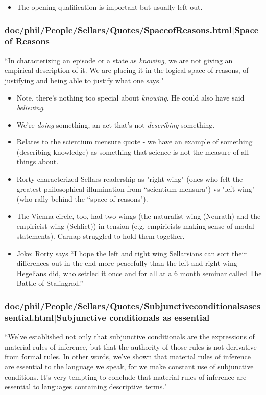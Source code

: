 \documentclass[12pt,a4paper]{report}
\begin{document}
\cite{sellars1956empiricism}

\begin{itemize}
    \item The opening qualification is important but usually left out.
\end{itemize}

\subsubsection{doc/phil/People/Sellars/Quotes/SpaceofReasons.html|Space of Reasons}
``In characterizing an episode or a state as \emph{knowing}, we are not giving an empirical description of it. We are placing it in the logical space of reasons, of justifying and being able to justify what one says." \cite{sellars1956empiricism}
    \begin{itemize}
        \item Note, there's nothing too special about \emph{knowing}. He could also have said \emph{believing}.
        \item  We're \emph{doing} something, an act that's not \emph{describing} something.
        \item Relates to the scientium mensure quote - we have an example of something (describing knowledge) as something that science is not the measure of all things about.
        \item Rorty characterized Sellars readership as "right wing" (ones who felt the greatest philosophical illumination from ``scientium mensura") vs "left wing" (who rally behind the ``space of reasons").
        \item The Vienna circle, too, had two wings (the naturalist wing (Neurath) and the empiricist wing (Schlict)) in tension (e.g. empiricists making sense of modal statements). Carnap struggled to hold them together.
        \item Joke: Rorty says ``I hope the left and right wing Sellarsians can sort their differences out in the end more peacefully than the left and right wing Hegelians did, who settled it once and for all at a 6 month seminar called The Battle of Stalingrad.''
    \end{itemize}
\subsubsection{doc/phil/People/Sellars/Quotes/Subjunctiveconditionalsasessential.html|Subjunctive conditionals as essential}
``We've established not only that subjunctive conditionals are the expressions of material rules of inference, but that the authority of those rules is not derivative from formal rules. In other words, we've shown that material rules of inference are essential to the language we speak, for we make constant use of subjunctive conditions. It's very tempting to conclude that material rules of inference are essential to languages containing descriptive terms."
\end{document}

